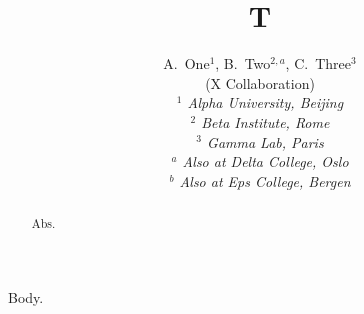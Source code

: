 \documentclass[aps,prd,superscriptaddress]{revtex4-1}
\begin{document}
\title{T}
\author{
		\begin{center}
	A.~One$^{1}$, B.~Two$^{2,a}$, C.~Three$^{3}$
	\\
		\vspace{0.2cm}
		(X Collaboration)\\
		\vspace{0.2cm} {\it
	$^{1}$ Alpha University, Beijing\\$^{2}$ Beta Institute, Rome\\$^{3}$ Gamma Lab, Paris\\
		\vspace{0.2cm}
		$^{a}$ Also at Delta College, Oslo\\$^{b}$ Also at Eps College, Bergen\\
		}\end{center}
		\vspace{0.4cm}
}
\begin{abstract}Abs.\end{abstract}
\maketitle
Body.
\end{document}

